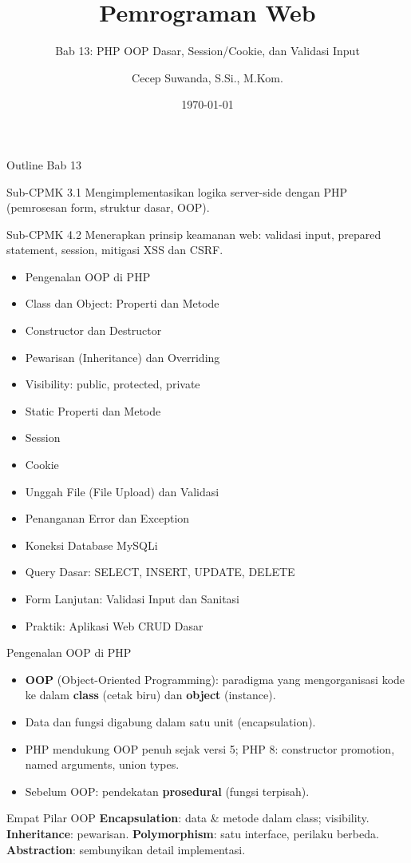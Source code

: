 \documentclass[handout]{beamer}
\title[Bab 13 -- PHP OOP]{Pemrograman Web}
\subtitle{Bab 13: PHP OOP Dasar, Session/Cookie, dan Validasi Input}
\author{Cecep Suwanda, S.Si., M.Kom.}
\institute{Universitas Bale Bandung}
\date{\today}
\begin{document}
\begin{frame}
	\titlepage
\end{frame}

\begin{frame}[shrink=35]{Outline Bab 13}
	\begin{block}{Sub-CPMK 3.1}
		Mengimplementasikan logika server-side dengan PHP (pemrosesan form, struktur dasar, OOP).
	\end{block}
	\begin{block}{Sub-CPMK 4.2}
		Menerapkan prinsip keamanan web: validasi input, prepared statement, session, mitigasi XSS dan CSRF.
	\end{block}
	\begin{itemize}
		\item Pengenalan OOP di PHP
		\item Class dan Object: Properti dan Metode
		\item Constructor dan Destructor
		\item Pewarisan (Inheritance) dan Overriding
		\item Visibility: public, protected, private
		\item Static Properti dan Metode
		\item Session
		\item Cookie
		\item Unggah File (File Upload) dan Validasi
		\item Penanganan Error dan Exception
		\item Koneksi Database MySQLi
		\item Query Dasar: SELECT, INSERT, UPDATE, DELETE
		\item Form Lanjutan: Validasi Input dan Sanitasi
		\item Praktik: Aplikasi Web CRUD Dasar
	\end{itemize}
\end{frame}

\begin{frame}{Pengenalan OOP di PHP}
	\begin{itemize}
		\item \textbf{OOP} (Object-Oriented Programming): paradigma yang mengorganisasi kode ke dalam \textbf{class} (cetak biru) dan \textbf{object} (instance).
		\item Data dan fungsi digabung dalam satu unit (encapsulation).
		\item PHP mendukung OOP penuh sejak versi 5; PHP 8: constructor promotion, named arguments, union types.
		\item Sebelum OOP: pendekatan \textbf{prosedural} (fungsi terpisah).
	\end{itemize}
	\begin{block}{Empat Pilar OOP}
		\textbf{Encapsulation}: data \& metode dalam class; visibility. \textbf{Inheritance}: pewarisan. \textbf{Polymorphism}: satu interface, perilaku berbeda. \textbf{Abstraction}: sembunyikan detail implementasi.
	\end{block}
\end{frame}
\end{document}
